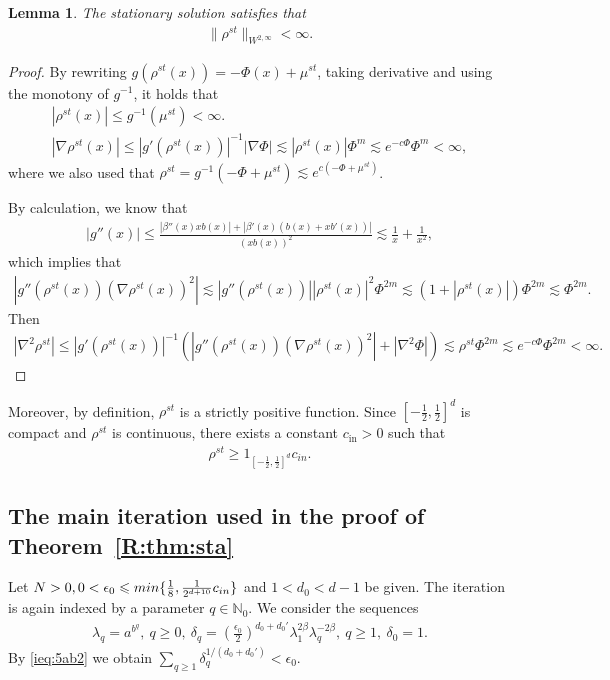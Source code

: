 \documentclass[10pt,a4paper]{amsart}
\numberwithin{equation}{section}
\newtheorem{lemma}[theorem]{Lemma}
\def\min{{\mathord{{\rm min}}}}
\def\geq{\geqslant}
\def\leq{\leqslant}
\def\min{{\mathord{{\rm min}}}}
\def\bl{\begin{lemma}}
\def\el{\end{lemma}}
\def\geq{\geqslant}
\def\leq{\leqslant}
\begin{document}
\bl
The stationary solution satisfies that 
\begin{align}
    \|\rho^{st}\|_{W^{2,\infty}}<\infty.\label{R:rhostc2}
\end{align}
\el
\begin{proof}
    By rewriting $ g(\rho^{st}(x))=-\Phi(x)+\mu^{st} $, taking derivative and using the monotony of $g^{-1}$, it holds that
    \begin{align*}
        |\rho^{st}(x)|\leq g^{-1}(\mu^{st})<\infty.\\
         |\nabla\rho^{st}(x)|\leq |g'(\rho^{st}(x))|^{-1}|\nabla\Phi|\lesssim|\rho^{st}(x)|\Phi^m\lesssim e^{-c \Phi} \Phi^m<\infty,
    \end{align*}
    where we also used that $\rho^{st}=g^{-1}(-\Phi+\mu^{st} )\lesssim e^{c(-\Phi+\mu^{st} )}$.
    
    By calculation, we know that 
    \begin{align*}
        |g''(x)|\leq \frac{|\beta''(x)xb(x)|+|\beta'(x)(b(x)+xb'(x))|}{(xb(x))^2}\lesssim \frac{1}{x}+\frac{1}{x^2},
    \end{align*}
    which implies that 
    \begin{align*}
         |g''(\rho^{st}(x))(\nabla\rho^{st}(x))^2|\lesssim |g''(\rho^{st}(x))||\rho^{st}(x)|^2\Phi^{2m}\lesssim (1+|\rho^{st}(x)|)\Phi^{2m}\lesssim \Phi^{2m}.
    \end{align*}
    Then 
    \begin{align*}
        |\nabla^2\rho^{st}|\leq |g'(\rho^{st}(x))|^{-1}(|g''(\rho^{st}(x))(\nabla\rho^{st}(x))^2|+|\nabla^2\Phi|)\lesssim \rho^{st}\Phi^{2m} \lesssim e^{-c \Phi} \Phi^{2m}<\infty.
    \end{align*}
\end{proof}
Moreover, by definition, $\rho^{st}$ is a strictly positive function. Since $[-\frac12,\frac12]^d$ is compact and $\rho^{st}$ is continuous, there exists a constant $c_{\mathrm{in}}>0$ such that 
\begin{align}
    \rho^{st}\geq 1_{[-\frac12,\frac12]^d}c_{in}.\label{R:rhost>}
\end{align}


\subsection{The main iteration used in the proof of Theorem~\ref{R:thm:sta}}

Let $N>0,0<\epsilon_0\leq \min\{ \frac18, \frac1 {2^{d+10}} c_{in}\}$ and $1<d_0<d-1$ be given.   The iteration is again indexed by a parameter
$
q\in\mathbb{N}_0.
$
We consider the sequences
 \begin{align*}
\lambda_q
=
a^{b^q},
\ 
q\geq0,
\ 
\delta_q
=
(\frac{\epsilon_0}{2})^{d_0+d_0'}
\lambda_1^{2\beta}
\lambda_q^{-2\beta},
\ 
q\geq1,
\ 
\delta_0=1.
\end{align*}  By \eqref{ieq:5ab2}
we obtain $
\sum_{q\geq1}\delta_q^{1/(d_0+d_0')}
<
\epsilon_0.
$
\end{document}
